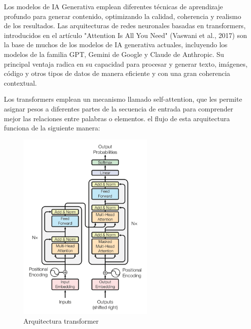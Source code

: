 Los modelos de IA Generativa emplean diferentes técnicas de aprendizaje profundo para generar contenido, optimizando la calidad, coherencia y realismo de los resultados.
Las arquitecturas de redes neuronales basadas en transformers, introducidos en el artículo "Attention Is All You Need" (Vaswani et al., 2017) \cite{vaswani2023attentionneed} son la base de muchos de los modelos de IA generativa actuales, incluyendo los modelos de la familia GPT, Gemini de Google y Claude de Anthropic. 
Su principal ventaja radica en su capacidad para procesar y generar texto, imágenes, código y otros tipos de datos de manera eficiente y con una gran coherencia contextual.

Los transformers emplean un mecanismo llamado self-attention, que les permite asignar pesos a diferentes partes de la secuencia de entrada para comprender mejor las relaciones entre palabras o elementos. el flujo de esta arquitectura funciona de la siguiente manera:

\begin{figure}[h]
	\centering
	\includegraphics[width=0.6\textwidth]{figs/transformer_arquitecture.png}
	\caption{Arquitectura transformer}
	\label{fig:context-anoni1}
\end{figure}


